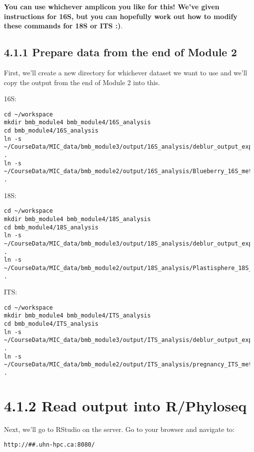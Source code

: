 \documentclass[
]{book}
\begin{document}
\textbf{You can use whichever amplicon you like for this! We've given instructions for 16S, but you can hopefully work out how to modify these commands for 18S or ITS :)}.

\subsection{4.1.1 Prepare data from the end of Module 2}\label{prepare-data-from-the-end-of-module-2}

First, we'll create a new directory for whichever dataset we want to use and we'll copy the output from the end of Module 2 into this.

16S:

\begin{verbatim}
cd ~/workspace
mkdir bmb_module4 bmb_module4/16S_analysis
cd bmb_module4/16S_analysis
ln -s ~/CourseData/MIC_data/bmb_module3/output/16S_analysis/deblur_output_exported/ .
ln -s ~/CourseData/MIC_data/bmb_module2/output/16S_analysis/Blueberry_16S_metadata.tsv .
\end{verbatim}

18S:

\begin{verbatim}
cd ~/workspace
mkdir bmb_module4 bmb_module4/18S_analysis
cd bmb_module4/18S_analysis
ln -s ~/CourseData/MIC_data/bmb_module3/output/18S_analysis/deblur_output_exported/ .
ln -s ~/CourseData/MIC_data/bmb_module2/output/18S_analysis/Plastisphere_18S_metadata.tsv .
\end{verbatim}

ITS:

\begin{verbatim}
cd ~/workspace
mkdir bmb_module4 bmb_module4/ITS_analysis
cd bmb_module4/ITS_analysis
ln -s ~/CourseData/MIC_data/bmb_module3/output/ITS_analysis/deblur_output_exported/ .
ln -s ~/CourseData/MIC_data/bmb_module2/output/ITS_analysis/pregnancy_ITS_metadata.tsv .
\end{verbatim}

\section{4.1.2 Read output into R/Phyloseq}\label{read-output-into-rphyloseq}

Next, we'll go to RStudio on the server. Go to your browser and navigate to:

\begin{verbatim}
http://##.uhn-hpc.ca:8080/
\end{verbatim}
\end{document}
